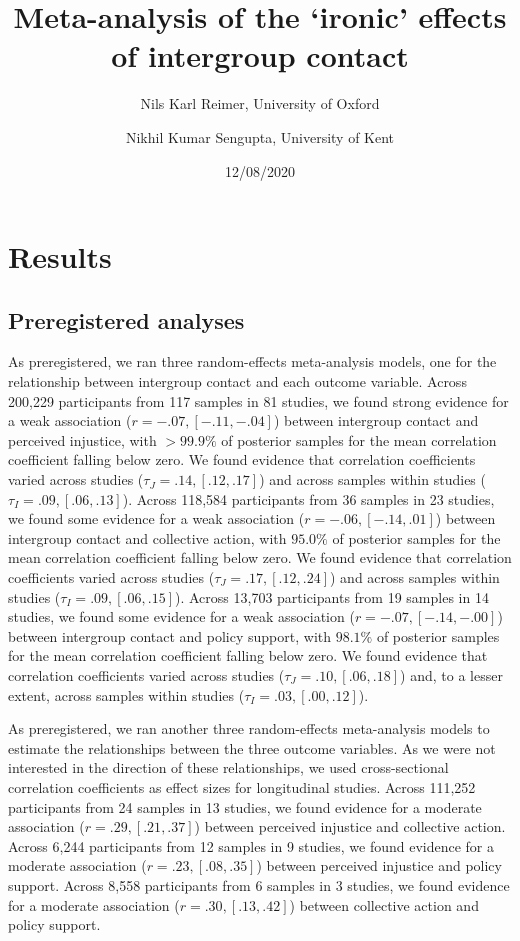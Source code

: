 \documentclass[
]{article}
\title{Meta-analysis of the `ironic' effects of intergroup contact}
\author{Nils Karl Reimer, University of Oxford \and Nikhil Kumar Sengupta, University of Kent}
\date{12/08/2020}
\begin{document}
\maketitle

\hypertarget{results}{%
\section{Results}\label{results}}

\hypertarget{preregistered-analyses}{%
\subsection{Preregistered analyses}\label{preregistered-analyses}}

As preregistered, we ran three random-effects meta-analysis models, one
for the relationship between intergroup contact and each outcome
variable. Across 200,229 participants from 117 samples in 81 studies, we
found strong evidence for a weak association (\(r = -.07, [-.11,-.04]\))
between intergroup contact and perceived injustice, with \(>99.9\%\) of
posterior samples for the mean correlation coefficient falling below
zero. We found evidence that correlation coefficients varied across
studies (\(\tau_J = .14, [.12,.17]\)) and across samples within studies
(\(\tau_I = .09, [.06,.13]\)). Across 118,584 participants from 36
samples in 23 studies, we found some evidence for a weak association
(\(r = -.06, [-.14,.01]\)) between intergroup contact and collective
action, with \(95.0\%\) of posterior samples for the mean correlation
coefficient falling below zero. We found evidence that correlation
coefficients varied across studies (\(\tau_J = .17, [.12,.24]\)) and
across samples within studies (\(\tau_I = .09, [.06,.15]\)). Across
13,703 participants from 19 samples in 14 studies, we found some
evidence for a weak association (\(r = -.07, [-.14,-.00]\)) between
intergroup contact and policy support, with \(98.1\%\) of posterior
samples for the mean correlation coefficient falling below zero. We
found evidence that correlation coefficients varied across studies
(\(\tau_J = .10, [.06,.18]\)) and, to a lesser extent, across samples
within studies (\(\tau_I = .03, [.00,.12]\)).

As preregistered, we ran another three random-effects meta-analysis
models to estimate the relationships between the three outcome
variables. As we were not interested in the direction of these
relationships, we used cross-sectional correlation coefficients as
effect sizes for longitudinal studies. Across 111,252 participants from
24 samples in 13 studies, we found evidence for a moderate association
(\(r = .29, [.21,.37]\)) between perceived injustice and collective
action. Across 6,244 participants from 12 samples in 9 studies, we found
evidence for a moderate association (\(r = .23, [.08,.35]\)) between
perceived injustice and policy support. Across 8,558 participants from 6
samples in 3 studies, we found evidence for a moderate association
(\(r = .30, [.13,.42]\)) between collective action and policy support.
\end{document}
